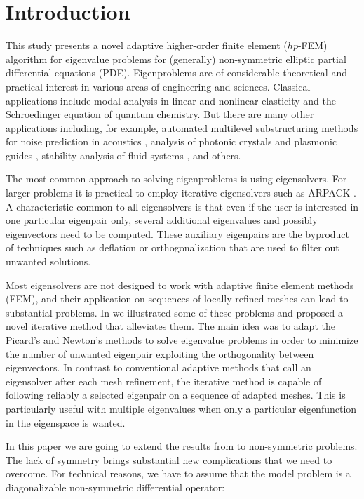 \documentclass[smallextended]{svjour3}
\begin{document}
\section{Introduction}\label{sec:intro}
\setcounter{equation}{0}

This study presents a novel adaptive higher-order finite element ($hp$-FEM) 
algorithm for eigenvalue problems for (generally) non-symmetric elliptic 
partial differential equations (PDE). Eigenproblems are of considerable 
theoretical and practical interest in various areas of engineering and 
sciences. Classical applications include modal analysis in linear and nonlinear
elasticity and the Schroedinger equation of quantum chemistry. But there
are many other applications including, for example, automated multilevel substructuring 
methods for noise prediction in acoustics \cite{lalor_prediction_2007},
analysis of photonic crystals \cite{pcf_apost,JoMeWi:95} and 
plasmonic guides \cite{berini_plasmon-polariton_2000},
stability analysis of fluid systems \cite{cliffe_adaptive_2010}, and others.

The most common approach to solving eigenproblems is using eigensolvers. For larger problems it is 
practical to employ iterative eigensolvers such as ARPACK \cite{arpack}. A characteristic common to 
all eigensolvers is that even if the user is interested in one particular eigenpair only, several 
additional eigenvalues and possibly eigenvectors need to be computed. These auxiliary eigenpairs are 
the byproduct of techniques such as deflation or orthogonalization that are used to filter out 
unwanted solutions.

Most eigensolvers are not designed to work with adaptive finite element methods (FEM), and 
their application on sequences of locally refined meshes can lead to substantial problems. 
In \cite{solin-giani} we illustrated some of these problems and proposed a novel iterative 
method that alleviates them. The main idea was to adapt the Picard's and Newton's methods 
to solve eigenvalue problems in order to minimize the number of unwanted eigenpair exploiting 
the orthogonality between eigenvectors. In contrast to conventional adaptive methods that 
call an eigensolver after each mesh refinement, the iterative method is capable of following 
reliably a selected eigenpair on a sequence of adapted meshes. This is particularly useful 
with multiple eigenvalues when only a particular eigenfunction in the eigenspace is wanted. 

In this paper we are going to extend the results from \cite{solin-giani} to non-symmetric problems.
The lack of symmetry brings substantial new complications that we need to overcome. For 
technical reasons, we have to assume that the model problem is a diagonalizable non-symmetric 
differential operator:
\end{document}
